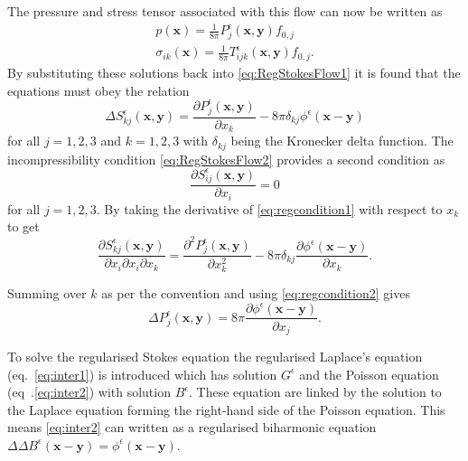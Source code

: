 The pressure and stress tensor associated with this flow can now be written as
\begin{gather}
\label{eq:regpressuresol}
    p(\bm{x}) = \frac{1}{8\pi}P^\epsilon_{j}(\bm{x},\bm{y})f_{0,j}\\
\label{eq:regstresssol}
    \sigma_{ik}(\bm{x}) = \frac{1}{8\pi}T^\epsilon_{ijk}(\bm{x},\bm{y})f_{0,j}.
\end{gather}
By substituting these solutions back into \cref{eq:RegStokesFlow1} it is found that the equations must obey the relation
\begin{equation}
\label{eq:regcondition1}
    \Delta S^\epsilon_{kj}(\bm{x},\bm{y}) = \frac{\partial P^\epsilon_{j}(\bm{x},\bm{y})}{\partial x_k} - 8\pi\delta_{kj}\phi^\epsilon(\bm{x}-\bm{y})
\end{equation}
for all $j=1,2,3$ and $k=1,2,3$ with $\delta_{kj}$ being the Kronecker delta function. The incompressibility condition \cref{eq:RegStokesFlow2} provides a second condition as
\begin{equation}
\label{eq:regcondition2}
    \frac{\partial S^\epsilon_{ij}(\bm{x},\bm{y})}{\partial x_i} = 0
\end{equation}
for all $j=1,2,3$. By taking the derivative of \cref{eq:regcondition1} with respect to $x_k$ to get
\begin{equation*}
    \frac{\partial S^\epsilon_{kj}(\bm{x},\bm{y})}{\partial x_i \partial x_i \partial x_k} = \frac{\partial^2 P^\epsilon_{j}(\bm{x},\bm{y})}{\partial x_k^2} - 8\pi\delta_{kj}\frac{\partial \phi^\epsilon(\bm{x}-\bm{y})}{\partial x_k}.
\end{equation*}

Summing over $k$ as per the convention and using \cref{eq:regcondition2} gives
\begin{equation}
\label{eq:regpressureeq}
    \Delta P^\epsilon_{j}(\bm{x},\bm{y}) = 8\pi\frac{\partial \phi^\epsilon(\bm{x}-\bm{y})}{\partial x_j}.
\end{equation}

To solve the regularised Stokes equation the regularised Laplace's equation (eq.~\ref{eq:inter1}) is introduced which has solution $G^\epsilon$ and the Poisson equation (eq~.\ref{eq:inter2}) with solution $B^\epsilon$. These equation are linked by the solution to the Laplace equation forming the right-hand side of the Poisson equation. This means \cref{eq:inter2} can written as a regularised biharmonic equation $\Delta \Delta B^\epsilon  (\bm{x}-\bm{y}) = \phi^\epsilon(\bm{x}-\bm{y})$.

